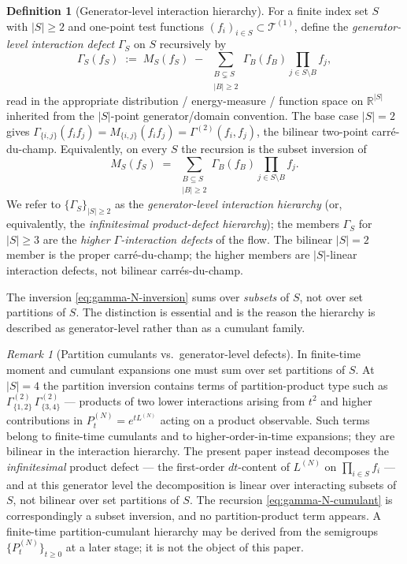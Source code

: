 \documentclass[11pt,reqno]{amsart}
\theoremstyle{plain}
\theoremstyle{definition}
\newtheorem{definition}[theorem]{Definition}
\theoremstyle{remark}
\newtheorem{remark}[theorem]{Remark}
\newcommand{\R}{\mathbb{R}}
\begin{document}
\begin{definition}[Generator-level interaction hierarchy]\label{def:N-point-cdc}
For a finite index set $S$ with $|S|\ge 2$ and one-point test
functions $(f_i)_{i\in S}\subset\mathcal T^{(1)}$, define the
\emph{generator-level interaction defect} $\Gamma_S$ on $S$
recursively by
\begin{equation}\label{eq:gamma-N-cumulant}
  \Gamma_S(f_S)
  \;:=\;
  M_S(f_S)
  \;-\;
  \!\!\sum_{\substack{B\subsetneq S\\ |B|\ge 2}}\!\!
  \Gamma_B(f_B)\prod_{j\in S\setminus B}f_j,
\end{equation}
read in the appropriate distribution / energy-measure / function
space on $\R^{|S|}$ inherited from the $|S|$-point generator/domain
convention. The base case $|S|=2$ gives
$\Gamma_{\{i,j\}}(f_if_j)=M_{\{i,j\}}(f_if_j)=\Gamma^{(2)}(f_i,f_j)$,
the bilinear two-point carr\'e-du-champ.
Equivalently, on every $S$ the recursion is the subset inversion of
\begin{equation}\label{eq:gamma-N-inversion}
  M_S(f_S)
  \;=\;
  \!\!\sum_{\substack{B\subseteq S\\ |B|\ge 2}}\!\!
  \Gamma_B(f_B)\prod_{j\in S\setminus B}f_j.
\end{equation}
We refer to $\{\Gamma_S\}_{|S|\ge 2}$ as the \emph{generator-level
interaction hierarchy} (or, equivalently, the
\emph{infinitesimal product-defect hierarchy}); the members
$\Gamma_S$ for $|S|\ge 3$ are the \emph{higher
$\Gamma$-interaction defects} of the flow. The bilinear $|S|=2$
member is the proper carr\'e-du-champ; the higher members are
$|S|$-linear interaction defects, not bilinear carr\'es-du-champ.
\end{definition}

The inversion \eqref{eq:gamma-N-inversion} sums over \emph{subsets}
of $S$, not over set partitions of $S$. The distinction is essential
and is the reason the hierarchy is described as generator-level
rather than as a cumulant family.

\begin{remark}[Partition cumulants vs.\ generator-level defects]\label{rem:partition-vs-generator}
In finite-time moment and cumulant expansions one must sum over set
partitions of $S$. At $|S|=4$ the partition inversion contains
terms of partition-product type such as
$\Gamma^{(2)}_{\{1,2\}}\,\Gamma^{(2)}_{\{3,4\}}$ ---
products of two lower interactions arising from $t^{2}$ and higher
contributions in $P_t^{(N)}=e^{tL^{(N)}}$ acting on a product
observable. Such terms belong to finite-time cumulants and to
higher-order-in-time expansions; they are bilinear in the
interaction hierarchy.
The present paper instead decomposes the \emph{infinitesimal}
product defect --- the first-order $dt$-content of $L^{(N)}$ on
$\prod_{i\in S}f_i$ --- and at this generator level the
decomposition is linear over interacting subsets of $S$, not
bilinear over set partitions of $S$. The recursion
\eqref{eq:gamma-N-cumulant} is correspondingly a subset inversion,
and no partition-product term appears. A finite-time
partition-cumulant hierarchy may be derived from the semigroups
$\{P_t^{(N)}\}_{t\ge 0}$ at a later stage; it is not the object of
this paper.
\end{remark}
\end{document}
